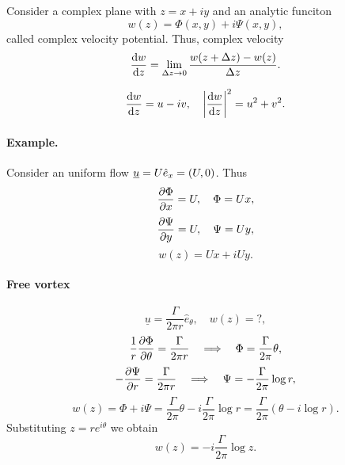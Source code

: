 \documentclass[11pt,oneside]{book}
\renewcommand{\vec}[1]{\underline{#1}}
\theoremstyle{definition} %
\theoremstyle{plain} %
\theoremstyle{remark} %
\theoremstyle{underline}
\begin{document}
  Consider a complex plane with $z = x + i y$ and an analytic funciton 
  \begin{displaymath}
    w(z) = \Phi(x,y) + i \Psi(x,y),
  \end{displaymath}
  called complex velocity potential.
  Thus, complex velocity
  \begin{displaymath}
    \frac{\mathrm{d} w}{\mathrm{d} z} = \lim_{\Delta z \rightarrow 0} \frac{w(z + \Delta z) - w(z)}{\Delta z}.
  \end{displaymath}

  \begin{displaymath}
    \frac{\mathrm{d} w}{\mathrm{d} z} = u - i v, \quad \left| \frac{\mathrm{d} w}{\mathrm{d} z}\right|^2 = u^2 + v^2.
  \end{displaymath}

  \paragraph{Example.} Consider an uniform flow $\vec u = U \vex = (U, 0)$.
  Thus
  \begin{displaymath}
    \frac{\partial \Phi}{\partial x} = U, \quad \Phi = U x,
  \end{displaymath}
  \begin{displaymath}
    \frac{\partial \Psi}{\partial y} = U, \quad \Psi = Uy, 
  \end{displaymath}
  \begin{displaymath}
    w(z) = U x + i U y.
  \end{displaymath}

  \paragraph{Free vortex}
  \begin{displaymath}
    \vec u = \frac{\Gamma}{2 \pi r} \hat e_\theta, \quad w(z) = ?,
  \end{displaymath}
  \begin{displaymath}
    \frac{1}{r} \frac{\partial \Phi}{\partial \theta} = \frac{\Gamma}{2 \pi r} \quad \Longrightarrow \quad \Phi = \frac{\Gamma}{2\pi}\theta,
  \end{displaymath}
  \begin{displaymath}
    - \frac{\partial \Psi}{\partial r} = \frac{\Gamma}{2\pi r} \quad \Longrightarrow \quad \Psi = - \frac{\Gamma}{2\pi} \log r,
  \end{displaymath}
  \begin{displaymath}
    w(z) = \Phi + i \Psi = \frac{\Gamma}{2 \pi}\theta - i \frac{\Gamma}{2\pi} \log r = \frac{\Gamma}{2 \pi} ( \theta - i \log r).
  \end{displaymath}
  Substituting $z = r e^{i \theta}$ we obtain 
  \begin{displaymath}
    w(z) = - i \frac{\Gamma}{2 \pi}\log z.
  \end{displaymath}
  
\end{document}

